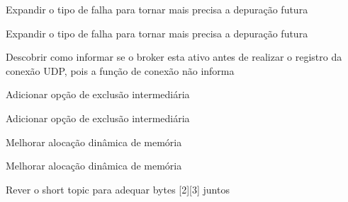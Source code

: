 
\begin{DoxyRefList}
\item[\label{todo__todo000006}%
\hypertarget{todo__todo000006}{}%
Global \hyperlink{sabado__list__old_8h_a172afa34fe10ad1ee4ffc0d226b35b4d}{mqtt\+\_\+sn\+\_\+check\+\_\+rc} (uint8\+\_\+t rc)]Expandir o tipo de falha para tornar mais precisa a depuração futura 

Expandir o tipo de falha para tornar mais precisa a depuração futura  
\item[\label{todo__todo000007}%
\hypertarget{todo__todo000007}{}%
Global \hyperlink{sabado__list__old_8h_a4ba04d5c2d485ddfe6a26a1b6d08c539}{mqtt\+\_\+sn\+\_\+create\+\_\+sck} (\hyperlink{structmqtt__sn__con__t}{mqtt\+\_\+sn\+\_\+con\+\_\+t} mqtt\+\_\+sn\+\_\+connection, char $\ast$topics\mbox{[}\mbox{]}, size\+\_\+t topic\+\_\+len)]Descobrir como informar se o broker esta ativo antes de realizar o registro da conexão U\+D\+P, pois a função de conexão não informa  
\item[\label{todo__todo000005}%
\hypertarget{todo__todo000005}{}%
Global \hyperlink{sabado__list__old_8h_ad0a729c99366dad086be6be954e71f2c}{mqtt\+\_\+sn\+\_\+delete\+\_\+queue} ()]Adicionar opção de exclusão intermediária 

Adicionar opção de exclusão intermediária  
\item[\label{todo__todo000004}%
\hypertarget{todo__todo000004}{}%
Global \hyperlink{sabado__list__old_8h_a575514d0f0fd3b6c5c4a2c75e604bf79}{mqtt\+\_\+sn\+\_\+insert\+\_\+queue} (\hyperlink{structmqtt__sn__task__t}{mqtt\+\_\+sn\+\_\+task\+\_\+t} new)]Melhorar alocação dinâmica de memória 

Melhorar alocação dinâmica de memória  
\item[\label{todo__todo000001}%
\hypertarget{todo__todo000001}{}%
Global \hyperlink{mqtt__sn_8h_af9146fa082fe2bc6612fb13dbb20ed36}{mqtt\+\_\+sn\+\_\+recv\+\_\+parser} (const uint8\+\_\+t $\ast$data)]Rever o short topic para adequar bytes \mbox{[}2\mbox{]}\mbox{[}3\mbox{]} juntos 
\end{DoxyRefList}